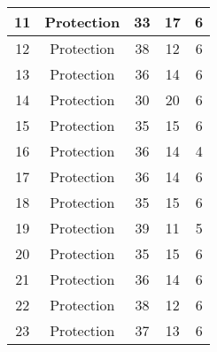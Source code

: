 \documentclass[results.tex]{subfiles}
\begin{document}
\begin{center}
\begin{tabular}{| c || c | c | c | c |}
            \hline
            11                      & Protection                   & 33                     & 17                      & 6                    \\
            \hline
            12                      & Protection                   & 38                     & 12                      & 6                    \\
            \hline
            13                      & Protection                   & 36                     & 14                      & 6                    \\
            \hline
            14                      & Protection                   & 30                     & 20                      & 6                    \\
            \hline
            15                      & Protection                   & 35                     & 15                      & 6                    \\
            \hline
            16                      & Protection                   & 36                     & 14                      & 4                    \\
            \hline
            17                      & Protection                   & 36                     & 14                      & 6                    \\
            \hline
            18                      & Protection                   & 35                     & 15                      & 6                    \\
            \hline
            19                      & Protection                   & 39                     & 11                      & 5                    \\
            \hline
            20                      & Protection                   & 35                     & 15                      & 6                    \\
            \hline
            21                      & Protection                   & 36                     & 14                      & 6                    \\
            \hline
            22                      & Protection                   & 38                     & 12                      & 6                    \\
            \hline
            23                      & Protection                   & 37                     & 13                      & 6                    \\

\end{tabular}
\end{center}
\end{document}
